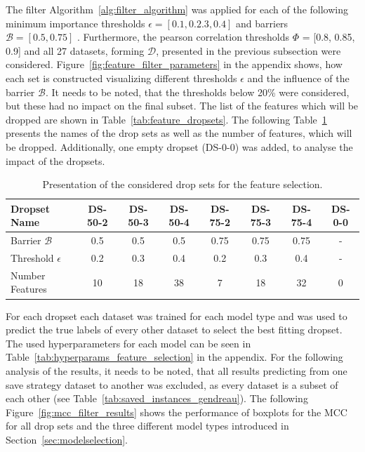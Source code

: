 The filter Algorithm~\ref{alg:filter_algorithm} was applied for each of the following minimum importance thresholds
$\epsilon =[0.1,0.2.3,0.4]$ and barriers $\mathcal{B}=[0.5,0.75]$ . Furthermore, the pearson correlation thresholds $\Phi$ = [0.8, 0.85, 0.9] and
all 27 datasets, forming $\mathcal{D}$, presented in the previous subsection were considered. Figure~\ref{fig:feature_filter_parameters}
in the appendix shows, how each set is constructed visualizing
different thresholds $\epsilon$ and the influence of the barrier $\mathcal{B}$. It needs to be noted, that
the thresholds below 20\% were considered, but these had no impact on the final subset. The list of the
features which will be dropped are shown in Table~\ref{tab:feature_dropsets}. The following Table~\ref{tab:drop_set_presentation_shortened}
presents the names of the drop sets as well as the number of features, which will be dropped.
Additionally, one empty dropset (DS-0-0) was added, to analyse the impact of the dropsets.
\begin{table}[ht]
    \centering
    \small
    \begin{tabular}{l c c c c c c c}
        \toprule
        Dropset Name          & DS-50-2 & DS-50-3 & DS-50-4 & DS-75-2 & DS-75-3 & DS-75-4 & DS-0-0 \\
        \midrule
        Barrier $\mathcal{B}$ & 0.5     & 0.5     & 0.5     & 0.75    & 0.75    & 0.75    & -      \\
        Threshold $\epsilon$  & 0.2     & 0.3     & 0.4     & 0.2     & 0.3     & 0.4     & -      \\
        Number Features       & 10      & 18      & 38      & 7       & 18      & 32      & 0      \\
        \bottomrule
    \end{tabular}
    \caption{Presentation of the considered drop sets for the feature selection.}
    \label{tab:drop_set_presentation_shortened}
\end{table}

For each dropset each dataset was trained for each model type and was used to predict the true labels of
every other dataset to select the best fitting dropset. The used hyperparameters for each model can be seen in
Table~\ref{tab:hyperparams_feature_selection} in the appendix. For the following analysis of the results, it
needs to be noted, that all results predicting from one save strategy dataset to another was excluded,
as every dataset is a subset of each other (see Table~\ref{tab:saved_instances_gendreau}).
The following Figure~\ref{fig:mcc_filter_results} shows the performance of boxplots for the \gls{MCC} for all drop sets
and the three different model types introduced in Section~\ref{sec:modelselection}.

